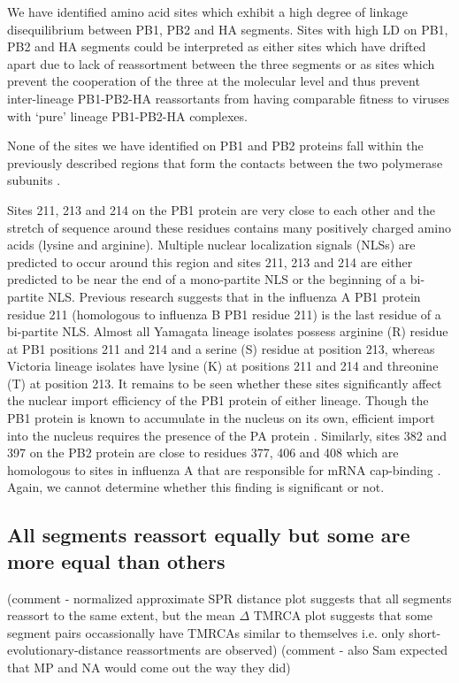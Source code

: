 \documentclass[11pt,oneside,letterpaper]{article}
\begin{document}
We have identified amino acid sites which exhibit a high degree of linkage disequilibrium between PB1, PB2 and HA segments.
Sites with high LD on PB1, PB2 and HA segments could be interpreted as either sites which have drifted apart due to lack of reassortment between the three segments or as sites which prevent the cooperation of the three at the molecular level and thus prevent inter-lineage PB1-PB2-HA reassortants from having comparable fitness to viruses with `pure' lineage PB1-PB2-HA complexes.

None of the sites we have identified on PB1 and PB2 proteins fall within the previously described regions that form the contacts between the two polymerase subunits \cite{sugiyama2009}.

Sites 211, 213 and 214 on the PB1 protein are very close to each other and the stretch of sequence around these residues contains many positively charged amino acids (lysine and arginine).
Multiple nuclear localization signals (NLSs) are predicted to occur around this region and sites 211, 213 and 214 are either predicted to be near the end of a mono-partite NLS or the beginning of a bi-partite NLS.
Previous research \cite{nath1990} suggests that in the influenza A PB1 protein residue 211 (homologous to influenza B PB1 residue 211) is the last residue of a bi-partite NLS.
Almost all Yamagata lineage isolates possess arginine (R) residue at PB1 positions 211 and 214 and a serine (S) residue at position 213, whereas Victoria lineage isolates have lysine (K) at positions 211 and 214 and threonine (T) at position 213.
It remains to be seen whether these sites significantly affect the nuclear import efficiency of the PB1 protein of either lineage.
Though the PB1 protein is known to accumulate in the nucleus on its own, efficient import into the nucleus requires the presence of the PA protein \cite{fodor2004}.
Similarly, sites 382 and 397 on the PB2 protein are close to residues 377, 406 and 408 which are homologous to sites in influenza A that are responsible for mRNA cap-binding \cite{guilligay2008}.
Again, we cannot determine whether this finding is significant or not.


\subsection*{All segments reassort equally but some are more equal than others}
(comment - normalized approximate SPR distance plot suggests that all segments reassort to the same extent, but the mean $\Delta$ TMRCA plot suggests that some segment pairs occassionally have TMRCAs similar to themselves i.e. only short-evolutionary-distance reassortments are observed)
(comment - also Sam expected that MP and NA would come out the way they did)
\end{document}

